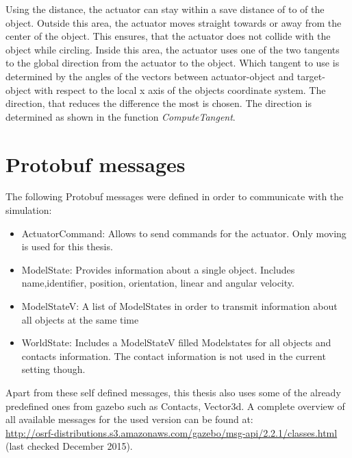 Using the distance, the actuator can stay within a save distance of  to  of the object. Outside this area, the actuator moves straight towards or away from the center of the object. This ensures, that the actuator does not collide with the object while circling.
Inside this area, the actuator uses one of the two tangents to the global direction from the actuator to the object. Which tangent to use is determined by the angles of the vectors between actuator-object and target-object with respect to the local x axis of the objects coordinate system. 
The direction, that reduces the difference the most is chosen. The direction is determined as shown in the function \textit{ComputeTangent}.

\newpage

\section{Protobuf messages \label{sec:protobufMessages}}

The following Protobuf messages were defined in order to communicate with the simulation:

\begin{itemize}
\item ActuatorCommand: Allows to send commands for the actuator. Only moving is used for this thesis.
\item ModelState: Provides information about a single object. Includes name,identifier, position, orientation, linear and angular velocity.
\item ModelState\textunderscore V: A list of ModelStates in order to transmit information about all objects at the same time
\item WorldState: Includes a ModelState\textunderscore V filled Modelstates for all objects and contacts information. The contact information is not used in the current setting though.
\end{itemize}

Apart from these self defined messages, this thesis also uses some of the already predefined ones from gazebo such as Contacts, Vector3d. A complete overview of all available messages for the used version can be found at: \\ \url{http://osrf-distributions.s3.amazonaws.com/gazebo/msg-api/2.2.1/classes.html}
(last checked December 2015).

